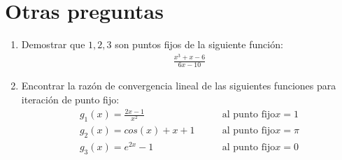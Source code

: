 \documentclass[spanish, fleqn]{article}
\begin{document}
\section{Otras preguntas}
\begin{enumerate}
\item Demostrar que $1,2,3$ son puntos fijos de la siguiente función:
\begin{align*}
\frac{x^3+x-6}{6x-10}
\end{align*}
\item Encontrar la razón de convergencia lineal de las siguientes funciones para iteración de punto fijo:
\begin{align*}
g_1(x) = \frac{2x-1}{x^2} &\qquad \text{al punto fijo} x=1
\\ g_2(x) = cos(x)+x+1 &\qquad \text{al punto fijo} x=\pi
\\ g_3(x) = e^{2x}-1 &\qquad \text{al punto fijo} x=0
\end{align*}

\end{enumerate}
\end{document}
